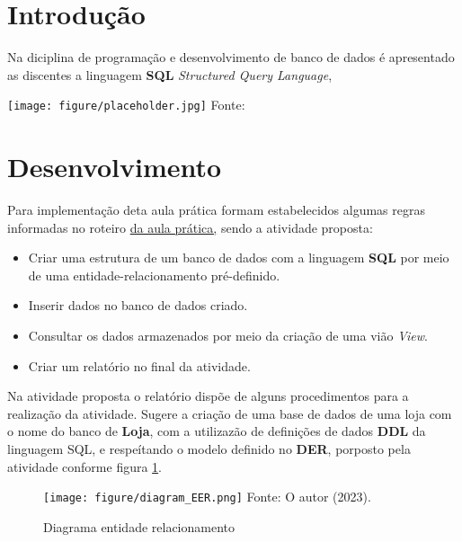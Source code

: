 
\section{Introdução}




\noindent \begin{minipage}[c]{0.6\textwidth}
  \vspace {1cm}
\par Na diciplina de programação e desenvolvimento de banco de dados é apresentado as discentes a linguagem \textbf{SQL} \textit{Structured Query Language},

\end{minipage}
\begin{minipage}[c]{0.4\textwidth}
  \texttt{[image: figure/placeholder.jpg]}
  	\label{fig:place}
    {\fontsize{10pt}{\baselineskip}\selectfont
    Fonte: 
  }

\end{minipage}


\section{Desenvolvimento}
\par Para implementação deta aula prática formam estabelecidos algumas regras informadas no roteiro \href{https://github.com/OgliariNatan/database_and_data_development/blob/main/aula%20pr%C3%A1tica.pdf}{da aula prática,} sendo a atividade proposta:
\begin{itemize}
  \item Criar uma estrutura de um banco de dados com a linguagem \textbf{SQL} por meio de uma entidade-relacionamento pré-definido.
  \item Inserir dados no banco de dados criado.
  \item Consultar os dados armazenados por meio da criação de uma vião \textit{View}.
  \item Criar um relatório no final da atividade.
\end{itemize}
\par Na atividade proposta o relatório dispõe de alguns procedimentos para a realização da atividade. Sugere a criação de uma base de dados de uma loja com o nome do banco de \textbf{Loja}, com a utilizazão de definições de dados \textbf{DDL} da linguagem SQL, e respeítando o modelo definido no \textbf{DER}, porposto pela atividade conforme figura \ref{fig:DER}.

\begin{figure}[h!]
  \caption{Diagrama entidade relacionamento}
  \texttt{[image: figure/diagram\_EER.png]}
  \label{fig:DER}
  {\fontsize{10pt}{\baselineskip}\selectfont
  Fonte: O autor (2023).}
\end{figure}

